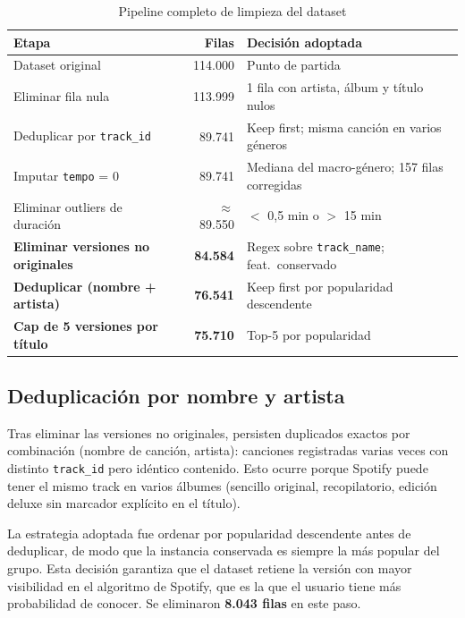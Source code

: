 \documentclass[12pt, a4paper]{book}
\theoremstyle{definition}
\begin{document}
\begin{table}[H]
\centering
\caption{Pipeline completo de limpieza del dataset}
\label{tab:pipeline_limpieza}
\small
\begin{tabular}{p{5.5cm} r p{5.5cm}}
\toprule
\textbf{Etapa} & \textbf{Filas} & \textbf{Decisión adoptada} \\
\midrule
Dataset original                           & 114.000 & Punto de partida \\
Eliminar fila nula                         & 113.999 & 1 fila con artista, álbum y título nulos \\
Deduplicar por \texttt{track\_id}          &  89.741 & Keep first; misma canción en varios géneros \\
Imputar \texttt{tempo} = 0                 &  89.741 & Mediana del macro-género; 157 filas corregidas \\
Eliminar outliers de duración              & $\approx$89.550 & $<$ 0{,}5 min o $>$ 15 min \\
\textbf{Eliminar versiones no originales}  & \textbf{84.584} & Regex sobre \texttt{track\_name}; feat.\ conservado \\
\textbf{Deduplicar (nombre + artista)}     & \textbf{76.541} & Keep first por popularidad descendente \\
\textbf{Cap de 5 versiones por título}     & \textbf{75.710} & Top-5 por popularidad \\
\bottomrule
\end{tabular}
\end{table}

\subsection{Deduplicación por nombre y artista}

Tras eliminar las versiones no originales, persisten duplicados exactos por
combinación (nombre de canción, artista): canciones registradas varias veces
con distinto \texttt{track\_id} pero idéntico contenido. Esto ocurre porque
Spotify puede tener el mismo track en varios álbumes (sencillo original,
recopilatorio, edición deluxe sin marcador explícito en el título).

La estrategia adoptada fue ordenar por popularidad descendente antes de
deduplicar, de modo que la instancia conservada es siempre la más popular
del grupo. Esta decisión garantiza que el dataset retiene la versión con
mayor visibilidad en el algoritmo de Spotify, que es la que el usuario
tiene más probabilidad de conocer. Se eliminaron \textbf{8.043 filas}
en este paso.
\end{document}
